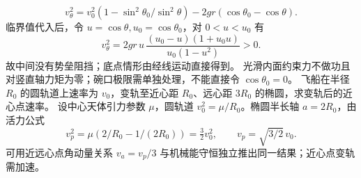 \[
v_\theta^2=v_0^2(1-\sin^2\theta_0/\sin^2\theta)-2gr(\cos\theta_0-\cos\theta).
\]
临界值代入后，令 $u=\cos\theta,u_0=\cos\theta_0$，对 $0<u<u_0$ 有
\[
v_\theta^2=2gr\,u\,\frac{(u_0-u)(1+u_0u)}{u_0(1-u^2)} >0.
\]
故中间没有势垒阻挡；底点情形由经线运动直接得到。
\crosscheck 光滑内面约束力不做功且对竖直轴力矩为零；碗口极限需单独处理，不能直接令 $\cos\theta_0=0$。
\problemtext 飞船在半径 $R_0$ 的圆轨道上速率为 $v_0$，变轨至近心距 $R_0$、远心距 $3R_0$ 的椭圆，求变轨后的近心点速率。
\workings 设中心天体引力参数 $\mu$，圆轨道 $v_0^2=\mu/R_0$。椭圆半长轴 $a=2R_0$，由活力公式
\[
v_p^2=\mu(2/R_0-1/(2R_0))=\tfrac32v_0^2,\qquad v_p=\sqrt{3/2}\,v_0.
\]
\crosscheck 可用近远心点角动量关系 $v_a=v_p/3$ 与机械能守恒独立推出同一结果；近心点变轨需加速。
